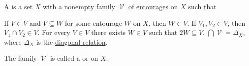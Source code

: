 \begin{definition}\label{def:uniform_space}
  A  is a set \( X \) with a nonempty family \( \mscrV \) of \hyperref[def:entourage]{entourages} on \( X \) such that
  \begin{thmenum}
     If \( V \in V \) and \( V \subseteq W \) for some entourage \( W \) on \( X \), then \( W \in V \).
     If \( V_1, V_2 \in V \), then \( V_1 \cap V_2 \in V \).
     For every \( V \in V \) there exists \( W \in V \) such that \( 2W \subseteq V \).
     \( \bigcap \mscrV = \Delta_X \), where \( \Delta_X \) is the \hyperref[def:binary_relation/diagonal]{diagonal relation}.
  \end{thmenum}

  The family \( \mscrV \) is called a  or  on \( X \).
\end{definition}


